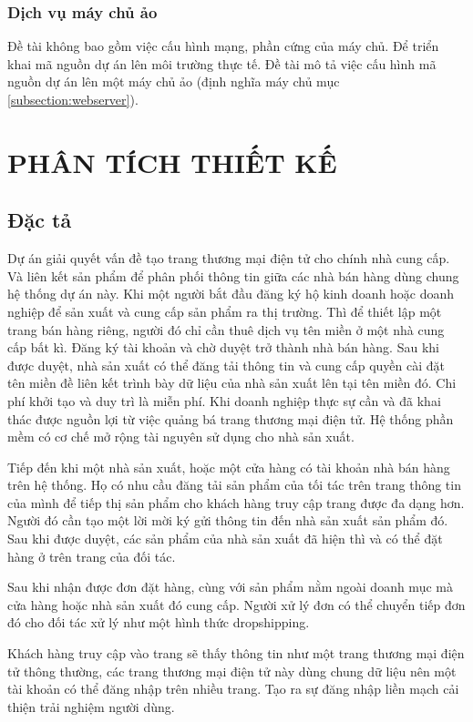 \documentclass[11pt]{report}
\begin{document}
	\subsection{Dịch vụ máy chủ ảo}
	Đề tài không bao gồm việc cấu hình mạng, phần cứng của máy chủ. Để triển khai mã nguồn dự án lên môi trường thực tế. Đề tài mô tả việc cấu hình mã nguồn dự án lên một máy chủ ảo (định nghĩa máy chủ mục \ref{subsection:webserver}).
	
	\chapter{PHÂN TÍCH THIẾT KẾ}
	\section{Đặc tả}
	
	Dự án giải quyết vấn đề tạo trang thương mại điện tử cho chính nhà cung cấp. Và liên kết sản phẩm để phân phối thông tin giữa các nhà bán hàng dùng chung hệ thống dự án này. Khi một người bắt đầu đăng ký hộ kinh doanh hoặc doanh nghiệp để sản xuất và cung cấp sản phẩm ra thị trường. Thì để thiết lập một trang bán hàng riêng, người đó chỉ cần thuê dịch vụ tên miền ở một nhà cung cấp bất kì. Đăng ký tài khoản và chờ duyệt trở thành nhà bán hàng. Sau khi được duyệt, nhà sản xuất có thể đăng tải thông tin và cung cấp quyền cài đặt tên miền đề liên kết trình bày dữ liệu của nhà sản xuất lên tại tên miền đó. Chi phí khởi tạo và duy trì là miễn phí. Khi doanh nghiệp thực sự cần và đã khai thác được nguồn lợi từ việc quảng bá trang thương mại điện tử. Hệ thống phần mềm có cơ chế mở rộng tài nguyên sử dụng cho nhà sản xuất.
	
	Tiếp đến khi một nhà sản xuất, hoặc một cửa hàng có tài khoản nhà bán hàng trên hệ thống. Họ có nhu cầu đăng tải sản phẩm của tối tác trên trang thông tin của mình để tiếp thị sản phẩm cho khách hàng truy cập trang được đa dạng hơn. Người đó cần tạo một lời mời ký gửi thông tin đến nhà sản xuất sản phẩm đó. Sau khi được duyệt, các sản phẩm của nhà sản xuất đã hiện thì và có thể đặt hàng ở trên trang của đối tác.
	
	Sau khi nhận được đơn đặt hàng, cùng với sản phẩm nằm ngoài doanh mục mà cửa hàng hoặc nhà sản xuất đó cung cấp. Người xử lý đơn có thể chuyển tiếp đơn đó cho đối tác xử lý như một hình thức dropshipping.
	
	Khách hàng truy cập vào trang sẽ thấy thông tin như một trang thương mại điện tử thông thường, các trang thương mại điện tử này dùng chung dữ liệu nên một tài khoản có thể đăng nhập trên nhiều trang. Tạo ra sự đăng nhập liền mạch cải thiện trải nghiệm người dùng.
	
\end{document}
